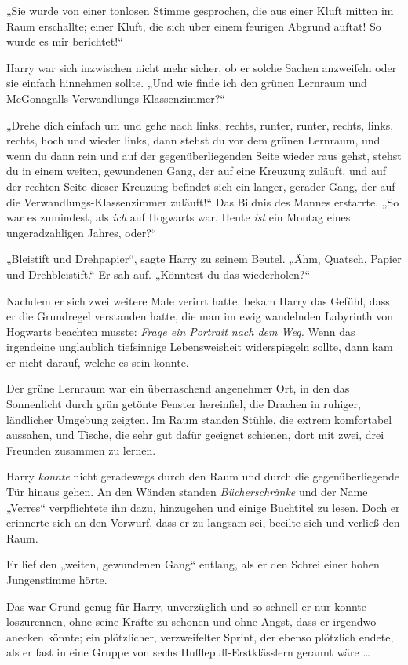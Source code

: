 {„Sie wurde von einer tonlosen Stimme gesprochen, die aus einer Kluft mitten im Raum erschallte; einer Kluft, die sich über einem feurigen Abgrund auftat! So wurde es mir berichtet!“

Harry war sich inzwischen nicht mehr sicher, ob er solche Sachen anzweifeln oder sie einfach hinnehmen sollte. „Und wie finde ich den grünen Lernraum und McGonagalls Verwandlungs-Klassenzimmer?“

„Drehe dich einfach um und gehe nach links, rechts, runter, runter, rechts, links, rechts, hoch und wieder links, dann stehst du vor dem grünen Lernraum, und wenn du dann rein und auf der gegenüberliegenden Seite wieder raus gehst, stehst du in einem weiten, gewundenen Gang, der auf eine Kreuzung zuläuft, und auf der rechten Seite dieser Kreuzung befindet sich ein langer, gerader Gang, der auf die Verwandlungs-Klassenzimmer zuläuft!“ Das Bildnis des Mannes erstarrte. „So war es zumindest, als \emph{ich} auf Hogwarts war. Heute \emph{ist} ein Montag eines ungeradzahligen Jahres, oder?“

„Bleistift und Drehpapier“, sagte Harry zu seinem Beutel. „Ähm, Quatsch, Papier und Drehbleistift.“ Er sah auf. „Könntest du das wiederholen?“

Nachdem er sich zwei weitere Male verirrt hatte, bekam Harry das Gefühl, dass er die Grundregel verstanden hatte, die man im ewig wandelnden Labyrinth von Hogwarts beachten musste: \emph{Frage ein Portrait nach dem Weg.} Wenn das irgendeine unglaublich tiefsinnige Lebensweisheit widerspiegeln sollte, dann kam er nicht darauf, welche es sein konnte.

Der grüne Lernraum war ein überraschend angenehmer Ort, in den das Sonnenlicht durch grün getönte Fenster hereinfiel, die Drachen in ruhiger, ländlicher Umgebung zeigten. Im Raum standen Stühle, die extrem komfortabel aussahen, und Tische, die sehr gut dafür geeignet schienen, dort mit zwei, drei Freunden zusammen zu lernen.

Harry \emph{konnte} nicht geradewegs durch den Raum und durch die gegenüberliegende Tür hinaus gehen. An den Wänden standen \emph{Bücherschränke} und der Name „Verres“ verpflichtete ihn dazu, hinzugehen und einige Buchtitel zu lesen. Doch er erinnerte sich an den Vorwurf, dass er zu langsam sei, beeilte sich und verließ den Raum.

Er lief den „weiten, gewundenen Gang“ entlang, als er den Schrei einer hohen Jungenstimme hörte.

Das war Grund genug für Harry, unverzüglich und so schnell er nur konnte loszurennen, ohne seine Kräfte zu schonen und ohne Angst, dass er irgendwo anecken könnte; ein plötzlicher, verzweifelter Sprint, der ebenso plötzlich endete, als er fast in eine Gruppe von sechs Hufflepuff-Erstklässlern gerannt wäre …

}
